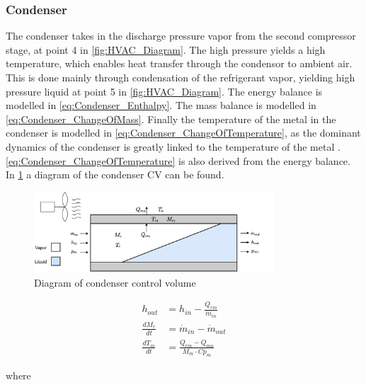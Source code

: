 \subsubsection{Condenser}

The condenser takes in the discharge pressure vapor from the second compressor stage, at point 4 in \cref{fig:HVAC_Diagram}. The high pressure yields a high temperature,
which enables heat transfer through the condensor to ambient air. This is done mainly through condensation of the refrigerant vapor, yielding high pressure liquid at point 5 in \cref{fig:HVAC_Diagram}.
The energy balance is modelled in \cref{eq:Condenser_Enthalpy}. The mass balance is modelled in \cref{eq:Condenser_ChangeOfMass}. Finally the temperature of the metal in the condenser is modelled in
\cref{eq:Condenser_ChangeOfTemperature}, as the dominant dynamics of the condenser is greatly linked to the temperature of the metal \cite{Sorensen2013}. \cref{eq:Condenser_ChangeOfTemperature} is also
derived from the energy balance. In \cref{fig:condenser_CV} a diagram of the condenser CV can be found.

\begin{figure}[h!]
	\centering
	\includegraphics[width=0.8\textwidth]{Graphics/Condenser.pdf}
	\caption{Diagram of condenser control volume}
	\label{fig:condenser_CV}
\end{figure}

\begin{align}
	h_{out} 			& = h_{in} - \frac{Q_{rm}}{\dot{m}_{in}}  	\label{eq:Condenser_Enthalpy} \\
	\frac{dM_r}{dt} 	& = \dot{m}_{in} - \dot{m}_{out} 				\label{eq:Condenser_ChangeOfMass}\\
	\frac{dT_m}{dt} 	& = \frac{Q_{rm} - Q_{ma}}{M_m \cdot Cp_m}		\label{eq:Condenser_ChangeOfTemperature}
\end{align}

where

